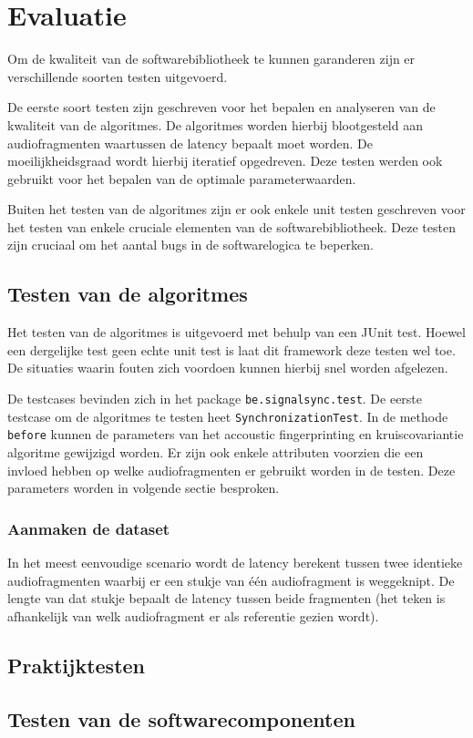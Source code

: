 \chapter{Evaluatie}
\label{evaluatie}

Om de kwaliteit van de softwarebibliotheek te kunnen garanderen zijn er verschillende soorten testen uitgevoerd. 

De eerste soort testen zijn geschreven voor het bepalen en analyseren van de kwaliteit van de algoritmes. De algoritmes worden hierbij blootgesteld aan audiofragmenten waartussen de latency bepaalt moet worden. De moeilijkheidsgraad wordt hierbij iteratief opgedreven. Deze testen werden ook gebruikt voor het bepalen van de optimale parameterwaarden.

Buiten het testen van de algoritmes zijn er ook enkele unit testen geschreven voor het testen van enkele cruciale elementen van de softwarebibliotheek. Deze testen zijn cruciaal om het aantal bugs in de softwarelogica te beperken.


\section{Testen van de algoritmes}

Het testen van de algoritmes is uitgevoerd met behulp van een JUnit test. Hoewel een dergelijke test geen echte unit test is laat dit framework deze testen wel toe. De situaties waarin fouten zich voordoen kunnen hierbij snel worden afgelezen.

De testcases bevinden zich in het package \texttt{be.signalsync.test}. De eerste testcase om de algoritmes te testen heet \texttt{SynchronizationTest}. In de methode \texttt{before} kunnen de parameters van het accoustic fingerprinting en kruiscovariantie algoritme gewijzigd worden. Er zijn ook enkele attributen voorzien die een invloed hebben op welke audiofragmenten er gebruikt worden in de testen. Deze parameters worden in volgende sectie besproken.

\subsection{Aanmaken de dataset}

In het meest eenvoudige scenario wordt de latency berekent tussen twee identieke audiofragmenten waarbij er een stukje van één audiofragment is weggeknipt. De lengte van dat stukje bepaalt de latency tussen beide fragmenten (het teken is afhankelijk van welk audiofragment er als referentie gezien wordt). 

\section{Praktijktesten}


\section{Testen van de softwarecomponenten}

